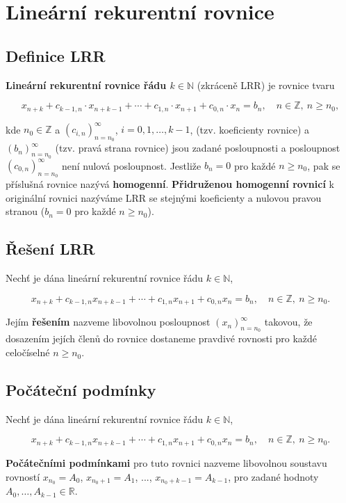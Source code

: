 \section{Lineární rekurentní rovnice}

\subsection*{Definice LRR}

\textbf{Lineární rekurentní rovnice řádu $k \in \mathbb{N}$} (zkráceně LRR) je rovnice tvaru

\[ x_{n+k} + c_{k-1,n} \cdot x_{n+k-1} + \cdots + c_{1,n} \cdot x_{n+1} + c_{0,n} \cdot x_n = b_n, \quad n \in \mathbb{Z}, \ n \geq n_0, \]

\noindent kde $n_0 \in \mathbb{Z}$ a $(c_{i,n})_{n=n_0}^\infty$, $i = 0,1,\ldots,k-1$, (tzv. koeficienty rovnice) a $(b_n)_{n=n_0}^\infty$ (tzv. pravá strana rovnice) jsou zadané posloupnosti a posloupnost $(c_{0,n})_{n=n_0}^\infty$ není nulová posloupnost.
Jestliže $b_n = 0$ pro každé $n \geq n_0$, pak se příslušná rovnice nazývá \textbf{homogenní}.
\textbf{Přidruženou homogenní rovnicí} k originální rovnici nazýváme LRR se stejnými koeficienty a nulovou pravou stranou ($b_n = 0$ pro každé $n \geq n_0$).

\subsection*{Řešení LRR}

Nechť je dána lineární rekurentní rovnice řádu $k \in \mathbb{N}$,

\[ x_{n+k} + c_{k-1,n} x_{n+k-1} + \cdots + c_{1,n} x_{n+1} + c_{0,n} x_n = b_n, \quad n \in \mathbb{Z}, \ n \geq n_0. \]

\noindent Jejím \textbf{řešením} nazveme libovolnou posloupnost $(x_n)_{n=n_0}^\infty$ takovou, že dosazením jejích členů do rovnice dostaneme pravdivé rovnosti pro každé celočíselné $n \geq n_0$.

\subsection*{Počáteční podmínky}

Nechť je dána lineární rekurentní rovnice řádu $k \in \mathbb{N}$,

\[ x_{n+k} + c_{k-1,n} x_{n+k-1} + \cdots + c_{1,n} x_{n+1} + c_{0,n} x_n = b_n,
    \quad n \in \mathbb{Z}, \ n \geq n_0. \]

\noindent \textbf{Počátečními podmínkami} pro tuto rovnici nazveme libovolnou soustavu rovností $x_{n_0} = A_0$, $x_{n_0 + 1} = A_1$, ..., $x_{n_0 + k - 1} = A_{k-1}$, pro zadané hodnoty $A_0,\ldots,A_{k-1} \in \mathbb{R}$.

